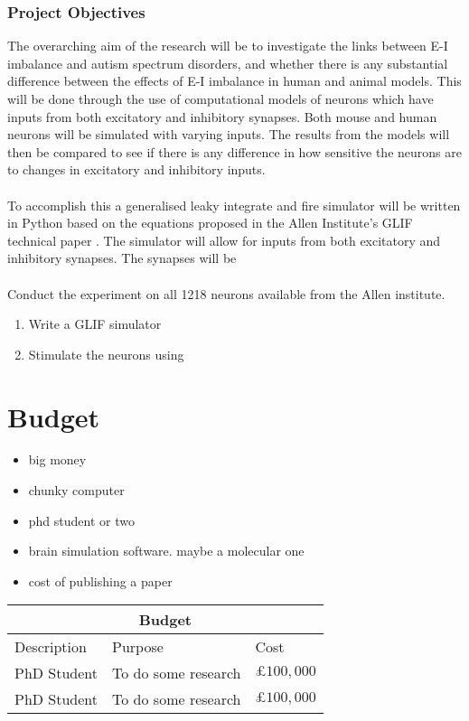 \documentclass{epsrc}
\begin{document}
\section{Project Objectives}
\noindent
The overarching aim of the research will be to investigate the links between E-I imbalance and autism spectrum disorders, and whether there is any substantial difference between the effects of E-I imbalance in human and animal models. This will be done through the use of computational models of neurons which have inputs from both excitatory and inhibitory synapses. Both mouse and human neurons will be simulated with varying inputs. The results from the models will then be compared to see if there is any difference in how sensitive the neurons are to changes in excitatory and inhibitory inputs. 
\\\\
To accomplish this a generalised leaky integrate and fire simulator will be written in Python based on the equations proposed in the Allen Institute's GLIF technical paper \cite{allen2017GLIF}. The simulator will allow for inputs from both excitatory and inhibitory synapses. The synapses will be 
\\\\
Conduct the experiment on all 1218 neurons available from the Allen institute.

\begin{enumerate}[label=\bfseries Work package \arabic*:, align=left]
	\item Write a GLIF simulator 
	\item Stimulate the neurons using 

\end{enumerate}

\part{Budget}
\begin{itemize}
\item big money
\item chunky computer
\item phd student or two
\item brain simulation software. maybe a molecular one
\item cost of publishing a paper
\end{itemize}

\begin{tabular}{ |p{3cm}|p{3cm}|p{3cm}|  }
 \hline
 \multicolumn{3}{|c|}{Budget} \\
 \hline
 Description & Purpose & Cost\\
 \hline
 PhD Student   & To do some research  &  $\pounds 100,000$\\
 PhD Student   & To do some research  &  $\pounds 100,000$\\
 \hline
\end{tabular}
\end{document}
